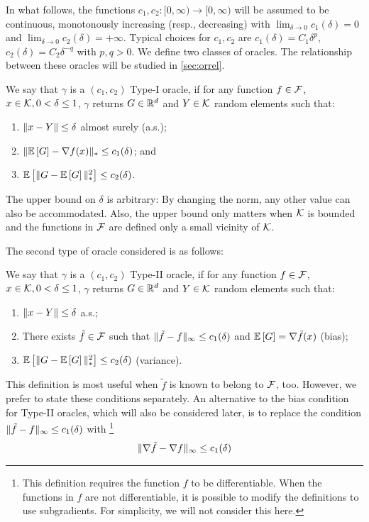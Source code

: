 In what follows, the functions $c_1,c_2:[0,\infty)\to [0,\infty)$ will be assumed to be continuous, 
monotonously increasing (resp., decreasing) with 
$\lim_{\delta\to  0} c_1(\delta)=0$ and $\lim_{\delta\to 0} c_2(\delta)=+\infty$.
Typical choices for $c_1,c_2$ are $c_1(\delta) = C_1 \delta^p$, $c_2(\delta) = C_2\delta^{-q}$ with $p,q>0$.
We define two classes of oracles. The relationship between these oracles will be studied in \cref{sec:orrel}.
\begin{definition}
\label{def:oracle1}
We say that $\gamma$ is a  $(c_1,c_2)$ Type-I oracle, if for any function $f\in \mathcal{F}$,
$x\in \mathcal{K},0<\delta\le 1$, $\gamma$ returns $G\in \mathbb{R}^d$ and  $Y\in \mathcal{K}$ random elements such that:
\begin{enumerate}
\item $\|x-Y\|\le \delta$ almost surely (a.s.);
\item $\| \mathbb{E}\left[G\right]  - \nabla f(x)  \|_* \le c_1(\delta) $; and
\item $\mathbb{E}\left[\| G -  \mathbb{E}\left[G\right] \|_*^2\right] \le c_2(\delta)$.
\end{enumerate}
\end{definition}
The upper bound on $\delta$ is arbitrary: By changing the norm, any other value can also be accommodated. Also, the upper bound only matters when $\mathcal{K}$ is bounded and the functions in $\mathcal{F}$ are defined only a small vicinity of $\mathcal{K}$.

The second type of oracle considered is as follows:
\begin{definition}
\label{def:oracle2}
We say that $\gamma$ is a  $(c_1,c_2)$ Type-II oracle, if for any function $f\in \mathcal{F}$,
$x\in \mathcal{K},0<\delta\le 1$, $\gamma$ returns $G\in \mathbb{R}^d$ and  $Y\in \mathcal{K}$ random elements such that:
\begin{enumerate}
\item $\|x-Y\|\le \delta$ a.s.;
\item There exists $\tilde{f} \in \mathcal{F}$ such that  
$\|\tilde{f}- f\|_\infty \le c_1(\delta)$  and
$\mathbb{E}\left[G\right]  = \nabla \tilde{f}(x)$ (bias);
\item $\mathbb{E}\left[\| G -  \mathbb{E}\left[G\right] \|_*^2\right] \le c_2(\delta)$ (variance).
\end{enumerate}
\end{definition}
This definition is most useful when $\tilde{f}$ is known to belong to $\mathcal{F}$, too. 
However, we prefer to state these conditions separately. 
An alternative to the bias condition for Type-II oracles, which will also be considered later, is to replace the condition $\|\tilde{f}-f\|_\infty \le c_1(\delta)$ with%
\footnote{
This definition requires the function $f$ to be differentiable. When the functions in $f$ are not differentiable, it is possible
to modify the definitions to use subgradients. For simplicity, we will not consider this here.
}
\begin{align}
\label{eq:oracle2alt}
\|\nabla \tilde{f}- \nabla f\|_\infty \le c_1(\delta)
\end{align}

